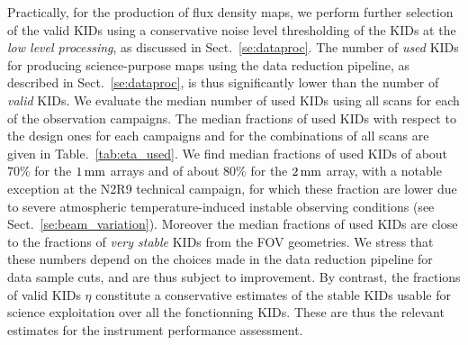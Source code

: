 Practically, for the production of flux density maps, we perform
further selection of the valid KIDs using a conservative noise level
thresholding of the KIDs at the \emph{low level processing}, as discussed in
Sect.~\ref{se:dataproc}. The number of \emph{used} KIDs for producing
science-purpose maps using the data reduction pipeline, as described
in Sect.~\ref{se:dataproc}, is thus significantly lower than the number of
\emph{valid} KIDs. We evaluate the median number of used KIDs using all scans
for each of the observation campaigns. The median fractions of used
KIDs with respect to the design ones for each campaigns and for the
combinations of all scans are given in Table.~\ref{tab:eta_used}. We
find median fractions of used KIDs of about $70\%$ for the
$1\, \rm{mm}$ arrays and of about $80\%$ for the $2\, \rm{mm}$ array,
with a notable exception at the N2R9 technical campaign, for which
these fraction are lower due to severe {\lp atmospheric} temperature-induced
instable observing conditions (see
Sect.~\ref{se:beam_variation}). Moreover the median fractions of used
KIDs are close to the fractions of
\emph{very stable} KIDs from the FOV geometries. We stress that these numbers
depend on the choices made in the data reduction pipeline for data
sample cuts, and are thus subject to improvement. By contrast, the
fractions of valid KIDs $\eta$ constitute a conservative estimates of the
stable KIDs usable for science exploitation over all the fonctionning
KIDs. These are thus the relevant estimates for the instrument
performance assessment.  
 
